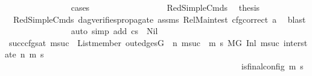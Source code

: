 \begin{isabellebody}
\ \ \ \ \ \ \ \ \ \ \ \ \ \ \isamarkupfalse%
\ cases\isanewline
\ \ \ \ \ \ \ \ \ \ \ \ \ \ \ \ \isamarkupfalse%
\ RedSimpleCmds\ \isamarkupfalse%
\ {\isacharquery}{\kern0pt}thesis\ \isamarkupfalse%
\ {}\ RedSimpleCmds{\isacharparenleft}{\kern0pt}{}{\isacharparenright}{\kern0pt}\ dag{\isacharunderscore}{\kern0pt}verifies{\isacharunderscore}{\kern0pt}propagate\ assms{\isacharparenleft}{\kern0pt}{}{\isacharminus}{\kern0pt}{}{\isacharparenright}{\kern0pt}\ Rel{\isacharunderscore}{\kern0pt}Main{\isacharunderscore}{\kern0pt}test{\isacharparenleft}{\kern0pt}{}{\isacharparenright}{\kern0pt}\ cfg{\isacharunderscore}{\kern0pt}correct\ a{}\ \isamarkupfalse%
\ blast\isanewline
\ \ \ \ \ \ \ \ \ \ \ \ \ \ \isamarkupfalse%
\ {\isacharparenleft}{\kern0pt}auto\ simp\ add{\isacharcolon}{\kern0pt}\ {\isacartoucheopen}cs{}\ {\isasymnoteq}\ Nil{\isacartoucheclose}{\isacharparenright}{\kern0pt}\isanewline
\isanewline
\ \ \ \ \ \ \ \ \ \ \ \ \ \ \isamarkupfalse%
\ succ{\isacharunderscore}{\kern0pt}cfg{\isacharunderscore}{\kern0pt}sat{\isacharcolon}{\kern0pt}\ {\isachardoublequoteopen}{\isacharparenleft}{\kern0pt}{\isasymforall}msuc{}{\isachardot}{\kern0pt}\ \ List{\isachardot}{\kern0pt}member\ {\isacharparenleft}{\kern0pt}out{\isacharunderscore}{\kern0pt}edges{\isacharparenleft}{\kern0pt}G{\isacharparenright}{\kern0pt}\ {\isacharbang}{\kern0pt}\ n{\isacharparenright}{\kern0pt}\ msuc{}\ {\isasymlongrightarrow}\ {\isacharparenleft}{\kern0pt}{\isasymforall}m{\isacharprime}{\kern0pt}\ s{\isacharprime}{\kern0pt}{\isachardot}{\kern0pt}\ {\isacharparenleft}{\kern0pt}{\isacharparenleft}{\kern0pt}M{\isacharcomma}{\kern0pt}{\isasymLambda}{\isacharcomma}{\kern0pt}{\isasymGamma}{\isacharcomma}{\kern0pt}{\isasymOmega}{\isacharcomma}{\kern0pt}G\ {\isasymturnstile}{\isacharparenleft}{\kern0pt}Inl\ {\isacharparenleft}{\kern0pt}msuc{}{\isacharparenright}{\kern0pt}{\isacharcomma}{\kern0pt}\ inter{\isacharunderscore}{\kern0pt}state{\isacharparenright}{\kern0pt}\ {\isacharminus}{\kern0pt}n{\isasymrightarrow}{\isacharasterisk}{\kern0pt}\ {\isacharparenleft}{\kern0pt}m{\isacharprime}{\kern0pt}{\isacharcomma}{\kern0pt}\ s{\isacharprime}{\kern0pt}{\isacharparenright}{\kern0pt}{\isacharparenright}{\kern0pt}\ {\isasymlongrightarrow}\isanewline
\ \ \ \ \ \ \ \ \ \ \ \ \ \ \ \ \ \ \ \ \ \ \ \ \ \ \ \ \ \ \ \ \ \ \ \ \ \ \ \ \ \ \ \ \ \ \ \ \ \ \ \ \ \ \ \ is{\isacharunderscore}{\kern0pt}final{\isacharunderscore}{\kern0pt}config\ {\isacharparenleft}{\kern0pt}m{\isacharprime}{\kern0pt}{\isacharcomma}{\kern0pt}\ s{\isacharprime}{\kern0pt}{\isacharparenright}{\kern0pt}\ {\isasymlongrightarrow}\ \isanewline

\end{isabellebody}
